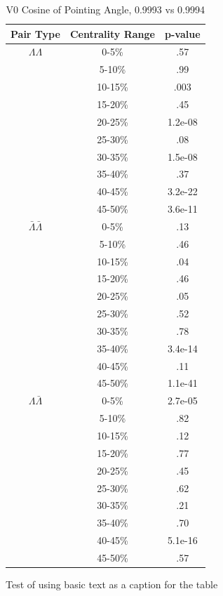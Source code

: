 \begin{table}
\caption {V0 Cosine of Pointing Angle, 0.9993 vs 0.9994} \label{tab:V0CosPointingPvalueTests9993vs9994}
\begin{center}
\begin{tabular}{| c | c | c |}
  \hline                       
  Pair Type & Centrality Range & p-value \\
  \hline
  $\Lambda\Lambda$ & 0-5\% & .57 \\
   & 5-10\%  & .99 \\
   & 10-15\% & .003 \\
   & 15-20\% & .45 \\
   & 20-25\% & 1.2e-08 \\
   & 25-30\% & .08 \\
   & 30-35\% & 1.5e-08 \\
   & 35-40\% & .37 \\
   & 40-45\% & 3.2e-22 \\
   & 45-50\% & 3.6e-11 \\
   \hline
  $\bar{\Lambda}\bar{\Lambda}$ &  0-5\% & .13 \\
   & 5-10\% & .46 \\
   & 10-15\% & .04 \\
   & 15-20\% & .46 \\
   & 20-25\% & .05 \\
   & 25-30\% & .52 \\
   & 30-35\% & .78 \\
   & 35-40\% & 3.4e-14 \\
   & 40-45\% & .11 \\
   & 45-50\% & 1.1e-41 \\
   \hline
  $\Lambda\bar{\Lambda}$ &  0-5\% & 2.7e-05 \\
   & 5-10\% & .82 \\
   & 10-15\% & .12 \\
   & 15-20\% & .77 \\
   & 20-25\% & .45 \\
   & 25-30\% & .62 \\
   & 30-35\% & .21 \\
   & 35-40\% & .70 \\
   & 40-45\% & 5.1e-16 \\
   & 45-50\% & .57 \\
  \hline  
\end{tabular}
Test of using basic text as a caption for the table
\end{center}
\end{table}





